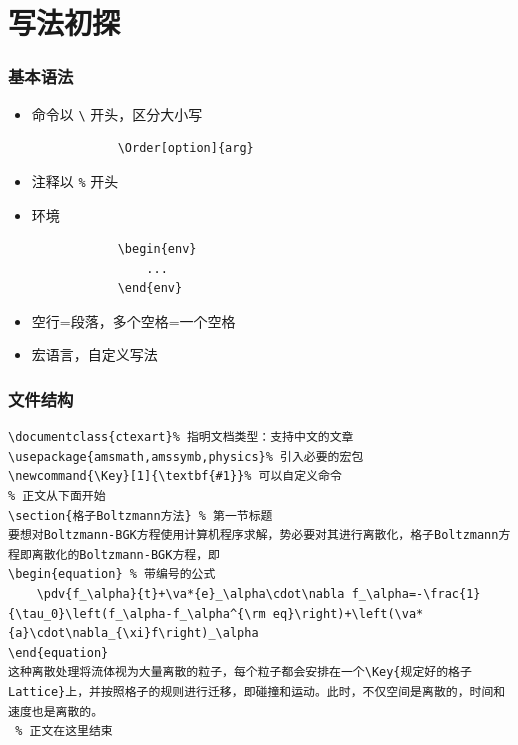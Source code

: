 \section{写法初探}
\begin{frame}[fragile]
    \frametitle{基本语法}
    \begin{itemize}
        \item 命令以 \verb|\| 开头，区分大小写
              \begin{lstlisting}
            \Order[option]{arg}
        \end{lstlisting}
        \item 注释以 \verb|%| 开头
        \item 环境
              \begin{lstlisting}
            \begin{env}
                ...
            \end{env}
        \end{lstlisting}
        \item 空行=段落，多个空格=一个空格
        \item 宏语言，自定义写法
    \end{itemize}
\end{frame}

\begin{frame}[fragile]
    \frametitle{文件结构}
    \scriptsize
    \begin{lstlisting}
\documentclass{ctexart}% 指明文档类型：支持中文的文章
\usepackage{amsmath,amssymb,physics}% 引入必要的宏包
\newcommand{\Key}[1]{\textbf{#1}}% 可以自定义命令
% 正文从下面开始
\section{格子Boltzmann方法} % 第一节标题
要想对Boltzmann-BGK方程使用计算机程序求解，势必要对其进行离散化，格子Boltzmann方程即离散化的Boltzmann-BGK方程，即
\begin{equation} % 带编号的公式
    \pdv{f_\alpha}{t}+\va*{e}_\alpha\cdot\nabla f_\alpha=-\frac{1}{\tau_0}\left(f_\alpha-f_\alpha^{\rm eq}\right)+\left(\va*{a}\cdot\nabla_{\xi}f\right)_\alpha
\end{equation}
这种离散处理将流体视为大量离散的粒子，每个粒子都会安排在一个\Key{规定好的格子Lattice}上，并按照格子的规则进行迁移，即碰撞和运动。此时，不仅空间是离散的，时间和速度也是离散的。
 % 正文在这里结束
    \end{lstlisting}
\end{frame}

